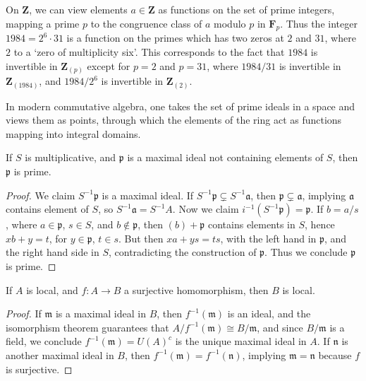 \begin{example}
    On $\mathbf{Z}$, we can view elements $a \in \mathbf{Z}$ as functions on the set of prime integers, mapping a prime $p$ to the congruence class of $a$ modulo $p$ in $\mathbf{F}_p$. Thus the integer $1984 = 2^6 \cdot 31$ is a function on the primes which has two zeros at $2$ and $31$, where $2$ to a `zero of multiplicity six'. This corresponds to the fact that $1984$ is invertible in $\mathbf{Z}_{(p)}$ except for $p = 2$ and $p = 31$, where $1984/31$ is invertible in $\mathbf{Z}_{(1984)}$, and $1984/2^6$ is invertible in $\mathbf{Z}_{(2)}$.
\end{example}

In modern commutative algebra, one takes the set of prime ideals in a space and views them as points, through which the elements of the ring act as functions mapping into integral domains.

\begin{theorem}
    If $S$ is multiplicative, and $\mathfrak{p}$ is a maximal ideal not containing elements of $S$, then $\mathfrak{p}$ is prime.
\end{theorem}
\begin{proof}
    We claim $S^{-1}\mathfrak{p}$ is a maximal ideal. If $S^{-1}\mathfrak{p} \subsetneq S^{-1}\mathfrak{a}$, then $\mathfrak{p} \subsetneq \mathfrak{a}$, implying $\mathfrak{a}$ contains element of $S$, so $S^{-1}\mathfrak{a} = S^{-1}A$. Now we claim $i^{-1}(S^{-1}\mathfrak{p}) = \mathfrak{p}$. If $b = a/s$, where $a \in \mathfrak{p}$, $s \in S$, and $b \not \in \mathfrak{p}$, then $(b) + \mathfrak{p}$ contains elements in $S$, hence $xb + y = t$, for $y \in \mathfrak{p}$, $t \in s$. But then $xa + ys = ts$, with the left hand in $\mathfrak{p}$, and the right hand side in $S$, contradicting the construction of $\mathfrak{p}$. Thus we conclude $\mathfrak{p}$ is prime.
\end{proof}

\begin{prop}
    If $A$ is local, and $f: A \to B$ a surjective homomorphism, then $B$ is local.
\end{prop}
\begin{proof}
    If $\mathfrak{m}$ is a maximal ideal in $B$, then $f^{-1}(\mathfrak{m})$ is an ideal, and the isomorphism theorem guarantees that $A/f^{-1}(\mathfrak{m}) \cong B/\mathfrak{m}$, and since $B/\mathfrak{m}$ is a field, we conclude $f^{-1}(\mathfrak{m}) = U(A)^c$ is the unique maximal ideal in $A$. If $\mathfrak{n}$ is another maximal ideal in $B$, then $f^{-1}(\mathfrak{m}) = f^{-1}(\mathfrak{n})$, implying $\mathfrak{m} = \mathfrak{n}$ because $f$ is surjective.
\end{proof}


